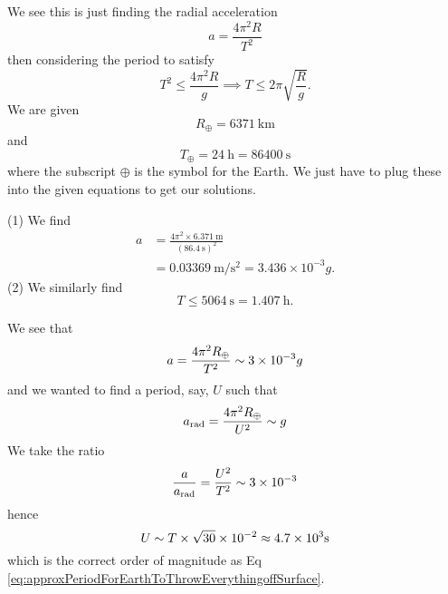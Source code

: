 \begin{soln}
\IDandSETUP
We see this is just finding the radial acceleration
\begin{equation*}
a = \frac{4\pi^{2}R}{T^{2}}
\end{equation*}
then considering the period to satisfy
\begin{equation}
T^{2}\leq \frac{4\pi^{2}R}{g} \implies
T\leq2\pi\sqrt{\frac{R}{g}}.
\end{equation}
We are given
\begin{equation}
R_{\oplus} = \SI{6371}{\kilo\meter}
\end{equation}
and
\begin{equation}
T_{\oplus} = \SI{24}{\hour} = \SI{86400}{\second}
\end{equation}
where the subscript $\oplus$ is the symbol for the Earth. We just have
to plug these into the given equations to get our solutions.

\EXECUTE
(1) We find
\begin{equation}
\begin{split}
a &= \frac{4\pi^{2}\times\SI{6.371}{\meter}}{(\SI{86.4}{\second})^{2}}\\
&= \SI{0.03369}{\meter\per\second\squared} = 3.436\times10^{-3}g.
\end{split}
\end{equation}
(2) We similarly find
\begin{equation}\label{eq:approxPeriodForEarthToThrowEverythingoffSurface}
T\leq\SI{5064}{\second}=\SI{1.407}{\hour}.
\end{equation}

\EVALUATE
We see that
\begin{equation}
a=\frac{4\pi^{2}R_{\oplus}}{T^{2}}\sim3\times10^{-3}g
\end{equation}
and we wanted to find a period, say, $U$ such that
\begin{equation}
a_{\text{rad}} = \frac{4\pi^{2}R_{\oplus}}{U^{2}}\sim g
\end{equation}
We take the ratio
\begin{equation}
\frac{a}{a_{\text{rad}}}=\frac{U^{2}}{T^{2}}\sim3\times10^{-3}
\end{equation}
hence
\begin{equation}
U\sim T\times\sqrt{30}\times10^{-2} \approx 4.7\times10^{3}\si{\second}
\end{equation}
which is the correct order of magnitude as Eq \eqref{eq:approxPeriodForEarthToThrowEverythingoffSurface}.
\end{soln}

